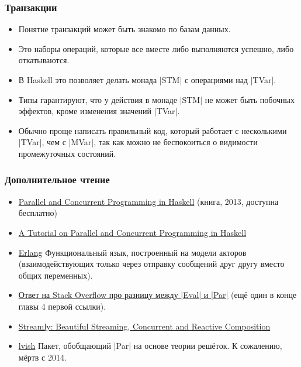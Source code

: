 \documentclass[11pt]{beamer}
\begin{document}
\begin{frame}[fragile]
\frametitle{Транзакции}
\begin{itemize}
\item Понятие транзакций может быть знакомо по базам данных.
\item Это наборы операций, которые все вместе либо выполняются успешно, либо откатываются.
\item В Haskell это позволяет делать монада \haskinline|STM| с операциями над \haskinline|TVar|.
\item Типы гарантируют, что у действия в монаде \haskinline|STM| не может быть побочных эффектов, кроме изменения значений \haskinline|TVar|.
\item Обычно проще написать правильный код, который работает с несколькими \haskinline|TVar|, чем с \haskinline|MVar|, так как можно не беспокоиться о видимости промежуточных состояний.
\end{itemize}
\end{frame}

\begin{frame}[fragile]
\frametitle{Дополнительное чтение}
\begin{itemize}
    \item \href{https://simonmar.github.io/pages/pcph.html}{Parallel and Concurrent Programming in Haskell} (книга, 2013, доступна бесплатно)
    \item \href{https://www.microsoft.com/en-us/research/wp-content/uploads/2016/02/parallel_haskell2.pdf}{A Tutorial on Parallel and Concurrent Programming in Haskell}
    \item \href{https://erlang.org/}{Erlang} Функциональный язык, построенный на модели акторов (взаимодействующих только через отправку сообщений друг другу вместо общих переменных).
    \item \href{https://stackoverflow.com/questions/23326920/difference-between-par-monad-and-eval-monad-with-deepseq/23428610#23428610}{Ответ на Stack Overflow про разницу между \haskinline|Eval| и \haskinline|Par|} (ещё один в конце главы 4 первой ссылки).
    \item \href{https://hackage.haskell.org/package/streamly}{Streamly: Beautiful Streaming, Concurrent and Reactive Composition}
    \item \href{https://hackage.haskell.org/package/lvish-1.1.4/}{lvish} Пакет, обобщающий \haskinline|Par| на основе теории решёток. К сожалению, мёртв с 2014.
\end{itemize}
\end{frame}
\end{document}
